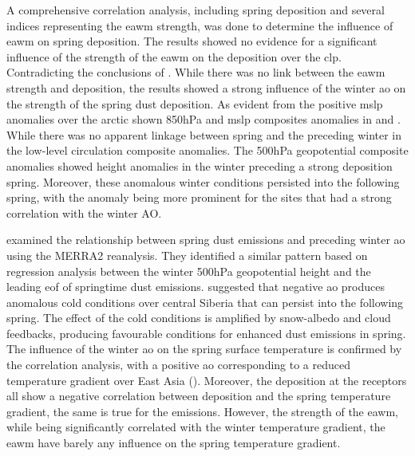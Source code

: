 A comprehensive correlation analysis, including spring deposition and several indices representing the \acrshort{eawm} strength, was done to determine the influence of \acrshort{eawm} on spring deposition. 
The results showed no evidence for a significant influence of the strength of the \acrshort{eawm} on the deposition over the \acrshort{clp}. Contradicting the conclusions of \textcite{wyrwoll2016cold}.
While there was no link between the \acrshort{eawm} strength and deposition, the results showed a strong influence of the winter \acrshort{ao} on the strength of the spring dust deposition.    
As evident from the positive \acrshort{mslp} anomalies over the arctic shown 850hPa and \acrshort{mslp} composites anomalies in  and . 
While there was no apparent linkage between spring and the preceding winter in the low-level circulation composite anomalies. 
The 500hPa geopotential composite anomalies showed height anomalies in the winter preceding a strong deposition spring. 
Moreover, these anomalous winter conditions persisted into the following spring, with the anomaly being more prominent for the sites that had a strong correlation with the winter AO. 

\textcite{liu2018influence} examined the relationship between spring dust emissions and preceding winter \acrshort{ao} using the MERRA2 reanalysis.
They identified a similar pattern based on regression analysis between the winter 500hPa geopotential height and the leading \acrshort{eof} of springtime dust emissions. 
\textcite{liu2018influence} suggested that negative \acrshort{ao} produces anomalous cold conditions over central Siberia that can persist into the following spring. 
The effect of the cold conditions is amplified by snow-albedo and cloud feedbacks, producing favourable conditions for enhanced dust emissions in spring\parencite{liu2018influence}. 
The influence of the winter \acrshort{ao} on the spring surface temperature is confirmed by the correlation analysis, with a positive \acrshort{ao} corresponding to a reduced temperature gradient over East Asia (). 
Moreover, the deposition at the receptors all show a negative correlation between deposition and the spring temperature gradient, the same is true for the emissions.
However, the strength of the \acrshort{eawm}, while being significantly correlated with the winter temperature gradient, the \acrshort{eawm} have barely any influence on the spring temperature gradient. 

